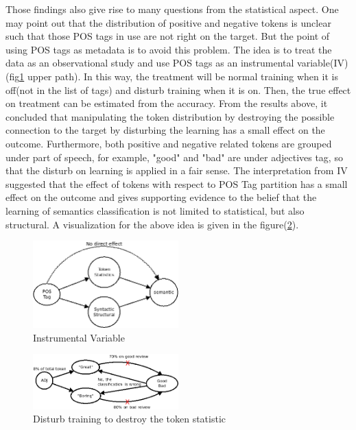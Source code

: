 \documentclass[12pt]{article}
\begin{document}
Those findings also give rise to many questions from the statistical aspect. One may point out that the distribution of positive and negative tokens is unclear such that those POS tags in use are not right on the target. But the point of using POS tags as metadata is to avoid this problem. The idea is to treat the data as an observational study and use POS tags as an instrumental variable(IV) (fig\ref{fig:combinIV} upper path). In this way, the treatment will be normal training when it is off(not in the list of tags) and disturb training when it is on. Then, the true effect on treatment can be estimated from the accuracy. From the results above, it concluded that manipulating the token distribution by destroying the possible connection to the target by disturbing the learning has a small effect on the outcome. Furthermore, both positive and negative related tokens are grouped under part of speech, for example, "good" and "bad" are under adjectives tag, so that the disturb on learning is applied in a fair sense. The interpretation from IV suggested that the effect of tokens with respect to POS Tag partition has a small effect on the outcome and gives supporting evidence to the belief that the learning of semantics classification is not limited to statistical, but also structural. A visualization for the above idea is given in the figure(\ref{fig:alwayswrongdetails}). 
\begin{figure} [!h]
\begin{center}
\includegraphics[width=0.5\textwidth]{figures/combin_IV.png}
\caption{Instrumental Variable}
\label{fig:combinIV}
\end{center}
\end{figure}

\begin{figure} [!h]
\begin{center}
\includegraphics[width=0.5\textwidth]{figures/alwayswrong_IV_detail.png}
\caption{Disturb training to destroy the token statistic}
\label{fig:alwayswrongdetails}
\end{center}
\end{figure}
\end{document}
